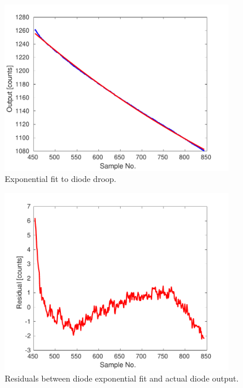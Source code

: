 \begin{figure}
  \centering
  \includegraphics[width=0.9\textwidth]{Figures/commissioning/iirDiodeFit}
  \caption{Exponential fit to diode droop.}
  \label{f:iirDiodeFit}
\end{figure}

\begin{figure}
  \centering
  \includegraphics[width=0.9\textwidth]{Figures/commissioning/iirDiodeFitResid}
  \caption{Residuals between diode exponential fit and actual diode output.}
  \label{f:iirDiodeFitResid}
\end{figure}


